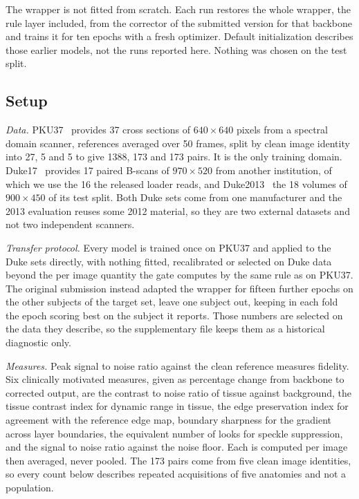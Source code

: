 The wrapper is not fitted from scratch. Each run restores the whole wrapper, the rule layer included,
from the corrector of the submitted version for that backbone and trains it for ten epochs with a
fresh optimizer. Default initialization describes those earlier models, not the runs reported here.
Nothing was chosen on the test split.


\subsection{Setup}
\label{sec:setup}

\emph{Data.} PKU37~\cite{geng2022triplet} provides 37 cross sections of $640 \times 640$ pixels from a
spectral domain scanner, references averaged over 50 frames, split by clean image identity into 27, 5
and 5 to give 1388, 173 and 173 pairs. It is the only training domain.
Duke17~\cite{fang2012sparsity} provides 17 paired B-scans of $970 \times 520$ from another
institution, of which we use the 16 the released loader reads, and Duke2013~\cite{fang2013fast} the
18 volumes of $900 \times 450$ of its test split. Both Duke sets come from one manufacturer and the 2013 evaluation reuses some 2012 material, so they
are two external datasets and not two independent scanners.

\emph{Transfer protocol.} Every model is trained once on PKU37 and applied to the Duke sets directly,
with nothing fitted, recalibrated or selected on Duke data beyond the per image quantity the gate
computes by the same rule as on PKU37. The original submission instead adapted the wrapper for
fifteen further epochs on the other subjects of the target set, leave one subject out, keeping in
each fold the epoch scoring best on the subject it reports. Those numbers are selected on the data
they describe, so the supplementary file keeps them as a historical diagnostic only.

\emph{Measures.} Peak signal to noise ratio against the clean reference measures fidelity. Six
clinically motivated measures, given as percentage change from backbone to corrected output, are the contrast to
noise ratio of tissue against background, the tissue contrast index for dynamic range in tissue, the
edge preservation index for agreement with the reference edge map, boundary sharpness for the
gradient across layer boundaries, the equivalent number of looks for speckle suppression, and the
signal to noise ratio against the noise floor. Each is computed per image then averaged, never pooled. The
173 pairs come from five clean image identities, so every count below describes repeated acquisitions
of five anatomies and not a population.


